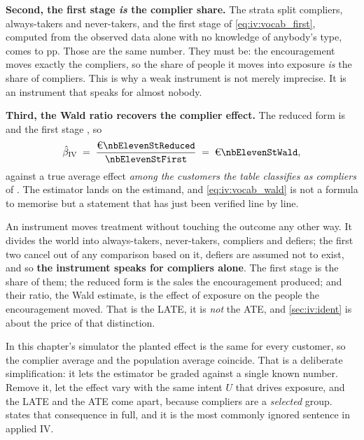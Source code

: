 \textbf{Second, the first stage \emph{is} the complier share.} The strata split
\pc{\nbElevenStShareComplier} compliers, \pc{\nbElevenStShareAlways} always-takers and
\pc{\nbElevenStShareNever} never-takers, and the first stage of \cref{eq:iv:vocab_first},
computed from the observed data alone with no knowledge of anybody's type, comes to
\nbElevenStFirstPp{} pp. Those are the same number. They must be: the encouragement moves exactly
the compliers, so the share of people it moves into exposure \emph{is} the share of compliers.
This is why a weak instrument is not merely imprecise. It is an instrument that speaks for
almost nobody.

\textbf{Third, the Wald ratio recovers the complier effect.} The reduced form is
\eur{\nbElevenStReduced} and the first stage \nbElevenStFirst, so
%
\[
  \hat\beta_{\text{IV}} \;=\; \frac{\eur{\nbElevenStReduced}}{\nbElevenStFirst}
  \;=\; \eur{\nbElevenStWald},
\]
%
against a true average effect \emph{among the customers the table classifies as compliers} of
\eur{\nbElevenStLate}. The estimator lands on the estimand, and \cref{eq:iv:vocab_wald} is not a
formula to memorise but a statement that has just been verified line by line.

\begin{recap}
An instrument moves treatment without touching the outcome any other way. It divides the world
into always-takers, never-takers, compliers and defiers; the first two cancel out of any
comparison based on it, defiers are assumed not to exist, and so \textbf{the instrument speaks for
compliers alone}. The first stage is the share of them; the reduced form is the sales the
encouragement produced; and their ratio, the Wald estimate, is the effect of exposure on the
people the encouragement moved. That is the LATE, it is \emph{not} the ATE, and
\cref{sec:iv:ident} is about the price of that distinction.
\end{recap}

\begin{remark}
In this chapter's simulator the planted effect is the same \eur{\nbElevenTrue} for every customer,
so the complier average and the population average coincide. That is a deliberate simplification:
it lets the estimator be graded against a single known number. Remove it, let the effect vary
with the same intent $U$ that drives exposure, and the LATE and the ATE come apart, because
compliers are a \emph{selected} group.  states that consequence in full, and it
is the most commonly ignored sentence in applied IV.
\end{remark}

